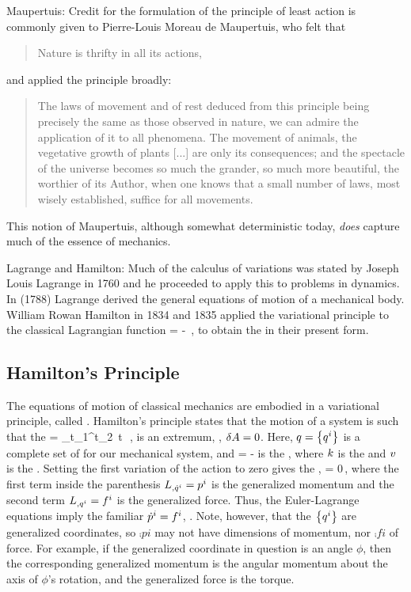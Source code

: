 Maupertuis: Credit for the formulation of the principle of least action is commonly given to Pierre-Louis Moreau de Maupertuis, who felt that 
\begin{quote}
Nature is thrifty in all its actions, 
\end{quote}
and applied the principle broadly:
\begin{quote}
The laws of movement and of rest deduced from this principle being precisely the same as those observed in nature, we can admire the application of it to all phenomena. The movement of animals, the vegetative growth of plants [...] are only its consequences; and the spectacle of the universe becomes so much the grander, so much more beautiful, the worthier of its Author, when one knows that a small number of laws, most wisely established, suffice for all movements.
\end{quote}
This notion of Maupertuis, although somewhat deterministic today, \emph{does} capture much of the essence of mechanics.

Lagrange and Hamilton: Much of the calculus of variations was stated by Joseph Louis Lagrange in 1760 and he proceeded to apply this to problems in dynamics. In  (1788) Lagrange derived the general equations of motion of a mechanical body. William Rowan Hamilton in 1834 and 1835 applied the variational principle to the classical Lagrangian function
\beq
\lag = \ken - \pen\,,
\eeq
to obtain the  in their present form.


\subsection{Hamilton's Principle}
The equations of motion of classical mechanics are embodied in a variational principle, called . Hamilton's principle states that the motion of a system is such that the 
\beq
\action{} = \int_{t_1}^{t_2}\, \dx t\, \lag{} \,,
\eeq
is an extremum, \ie, $\delta A = 0$. Here, $q = \left\lbrace{{q}^{i}}\right\rbrace$ is a complete set of  for our mechanical system, and
\beq
\lag = \ken - \pen
\eeq
is the , where $k$ is the  and $v$ is the . Setting the first variation of the action to zero gives the ,
\beq
{} = 0\,,
\eeq
where the first term inside the parenthesis ${L}_{,{{\dot{q}}^{i}}} = {p}^{i}$ is the generalized momentum and the second term ${L}_{,{{q}^{i}}} = {f}^{i}$ is the generalized force. Thus, the Euler-Lagrange equations imply the familiar ${\dot{p}}^{i} = {f}^{i}$, \aka {}. Note, however, that the $\left\lbrace{{q}^{i}}\right\rbrace$ are generalized coordinates, so $\comp pi$ may not have dimensions of momentum, nor $\comp fi$ of force. For example, if the generalized coordinate in question is an angle $\phi$, then the corresponding generalized momentum is the angular momentum about the axis of $\phi$'s rotation, and the generalized force is the torque.


